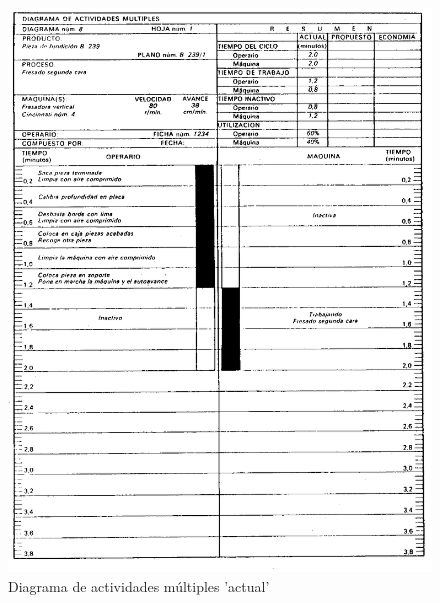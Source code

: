 \documentclass[a4paper,oneside,11pt]{article}
\begin{document}
\begin{figure} [ht!]
    \centering
    \includegraphics[scale=1.3]{actividades multiples.png}
    \caption{Diagrama de actividades múltiples 'actual'}
    \label{fig:act mult}
\end{figure}
\end{document}
